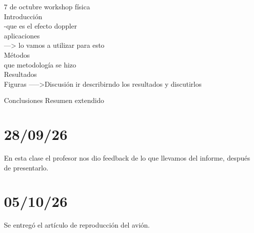 \documentclass{article}
\begin{document}
7 de octubre workshop  física\\

Introducción\\
-que es el efecto doppler\\
aplicaciones\\
---> lo vamos a utilizar para esto\\

Métodos\\
que metodología se hizo\\

Resultados\\
Figuras  
----->Discusión
ir describirndo los resultados y discutirlos

Conclusiones
Resumen extendido 


\section{28/09/26}

En esta clase el profesor nos dio feedback de lo que llevamos del informe, después de presentarlo.


\section{05/10/26}

Se entregó el artículo de reproducción del avión.
\end{document}
